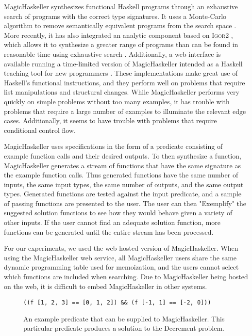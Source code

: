 MagicHaskeller \cite{katayama2010,Katayama05} synthesizes functional Haskell programs through an exhaustive search of programs with the correct type signatures. It uses a Monte-Carlo algorithm to remove semantically equivalent programs from the search space \cite{Katayama2008}. More recently, it has also integrated an analytic component based on \textsc{Igor2} \cite{kitzelmann2011two}, which allows it to synthesize a greater range of programs than can be found in reasonable time using exhaustive search \cite{katayama2011magichaskeller}. Additionally, a web interface is available running a time-limited version of MagicHaskeller intended as a Haskell teaching tool for new programmers \cite{katayama2013}. These implementations make great use of Haskell's functional instructions, and they perform well on problems that require list manipulations and structural changes. While MagicHaskeller performs very quickly on simple problems without too many examples, it has trouble with problems that require a large number of examples to illuminate the relevant edge cases. Additionally, it seems to have trouble with problems that require conditional control flow.

MagicHaskeller uses specifications in the form of a predicate consisting of example function calls and their desired outputs. To then synthesize a function, MagicHaskeller generates a stream of functions that have the same signature as the example function calls. Thus generated functions have the same number of inputs, the same input types, the same number of outputs, and the same output types.
Generated functions are tested against the input predicate, and a sample of passing functions are presented to the user. The user can then "Exemplify" the suggested solution functions to see how they would behave given a variety of other inputs. If the user cannot find an adequate solution function, more functions can be generated until the entire stream has been processed.

For our experiments, we used the web hosted version of MagicHaskeller. When using the MagicHaskeller web service, all MagicHaskeller users share the same dynamic programming table used for memoization, and the users cannot select which functions are included when searching. Due to MagicHaskeller being hosted on the web, it is difficult to embed MagicHaskeller in other systems.

\begin{figure}
\begin{verbatim}
((f [1, 2, 3] == [0, 1, 2]) && (f [-1, 1] == [-2, 0]))  
\end{verbatim}
\caption{An example predicate that can be supplied to MagicHaskeller. This particular predicate produces a solution to the Decrement problem.}
\label{fig:MHpred}
\end{figure}

